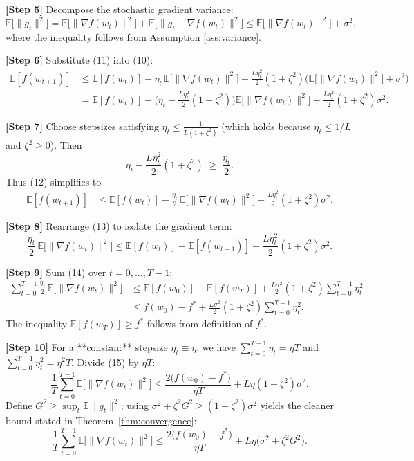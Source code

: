 \documentclass{article}
\begin{document}
\noindent\textbf{[Step 5]} Decompose the stochastic gradient variance:
\[
\mathbb{E}\!\big[\|g_{t}\|^{2}\big]
= \mathbb{E}\!\big[\|\nabla f(w_{t})\|^{2}\big]
  +\mathbb{E}\!\big[\|g_{t}-\nabla f(w_{t})\|^{2}\big]\le
  \mathbb{E}\!\big[\|\nabla f(w_{t})\|^{2}\big]+\sigma^{2}, \tag{11}
\]
where the inequality follows from Assumption \ref{ass:variance}.

\noindent\textbf{[Step 6]} Substitute (11) into (10):
\begin{align}
\mathbb{E}[f(w_{t+1})]
&\le \mathbb{E}[f(w_{t})]
   -\eta_{t}\,\mathbb{E}\!\big[\|\nabla f(w_{t})\|^{2}\big]
   +\frac{L\eta_{t}^{2}}{2}(1+\zeta^{2})
      \Big(\mathbb{E}\!\big[\|\nabla f(w_{t})\|^{2}\big]+\sigma^{2}\Big) \nonumber\\
&= \mathbb{E}[f(w_{t})]
   -\Big(\eta_{t}-\frac{L\eta_{t}^{2}}{2}(1+\zeta^{2})\Big)
      \mathbb{E}\!\big[\|\nabla f(w_{t})\|^{2}\big]
   +\frac{L\eta_{t}^{2}}{2}(1+\zeta^{2})\sigma^{2}. \tag{12}
\end{align}

\noindent\textbf{[Step 7]} Choose stepsizes satisfying $\eta_{t}\le \frac{1}{L(1+\zeta^{2})}$ (which holds because $\eta_{t}\le 1/L$ and $\zeta^{2}\ge0$). Then
\[
\eta_{t}-\frac{L\eta_{t}^{2}}{2}(1+\zeta^{2})\;\ge\;\frac{\eta_{t}}{2}.
\]
Thus (12) simplifies to
\begin{align}
\mathbb{E}[f(w_{t+1})]
&\le \mathbb{E}[f(w_{t})]
   -\frac{\eta_{t}}{2}\,\mathbb{E}\!\big[\|\nabla f(w_{t})\|^{2}\big]
   +\frac{L\eta_{t}^{2}}{2}(1+\zeta^{2})\sigma^{2}. \tag{13}
\end{align}

\noindent\textbf{[Step 8]} Rearrange (13) to isolate the gradient term:
\[
\frac{\eta_{t}}{2}\,\mathbb{E}\!\big[\|\nabla f(w_{t})\|^{2}\big]
\le \mathbb{E}[f(w_{t})]-\mathbb{E}[f(w_{t+1})]
   +\frac{L\eta_{t}^{2}}{2}(1+\zeta^{2})\sigma^{2}. \tag{14}
\]

\noindent\textbf{[Step 9]} Sum (14) over $t=0,\dots,T-1$:
\begin{align}
\sum_{t=0}^{T-1}\frac{\eta_{t}}{2}\,\mathbb{E}\!\big[\|\nabla f(w_{t})\|^{2}\big]
&\le \mathbb{E}[f(w_{0})]-\mathbb{E}[f(w_{T})]
   +\frac{L\sigma^{2}}{2}(1+\zeta^{2})\sum_{t=0}^{T-1}\eta_{t}^{2}\nonumber\\
&\le f(w_{0})-f^{*}
   +\frac{L\sigma^{2}}{2}(1+\zeta^{2})\sum_{t=0}^{T-1}\eta_{t}^{2}. \tag{15}
\end{align}
The inequality $ \mathbb{E}[f(w_{T})]\ge f^{*}$ follows from definition of $f^{*}$.

\noindent\textbf{[Step 10]} For a **constant** stepsize $\eta_{t}\equiv\eta$, we have $\sum_{t=0}^{T-1}\eta_{t}= \eta T$ and $\sum_{t=0}^{T-1}\eta_{t}^{2}= \eta^{2}T$. Divide (15) by $\eta T$:
\[
\frac{1}{T}\sum_{t=0}^{T-1}\mathbb{E}\!\big[\|\nabla f(w_{t})\|^{2}\big]
\le
\frac{2\big(f(w_{0})-f^{*}\big)}{\eta T}
   +L\eta(1+\zeta^{2})\sigma^{2}. \tag{16}
\]
Define $G^{2}\ge \sup_{t}\mathbb{E}\|g_{t}\|^{2}$; using $\sigma^{2}+ \zeta^{2}G^{2}\ge (1+\zeta^{2})\sigma^{2}$ yields the cleaner bound stated in Theorem~\ref{thm:convergence}:
\[
\frac{1}{T}\sum_{t=0}^{T-1}\mathbb{E}\!\big[\|\nabla f(w_{t})\|^{2}\big]
\le
\frac{2\big(f(w_{0})-f^{*}\big)}{\eta T}
   +L\eta\big(\sigma^{2}+\zeta^{2}G^{2}\big). \tag{17}
\]
\end{document}
